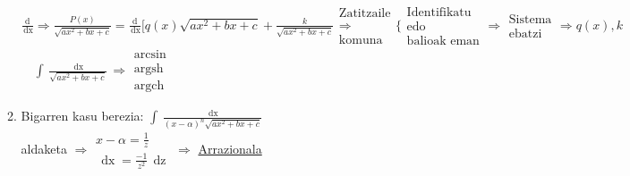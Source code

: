 \documentclass[8pt]{article}
\DeclareMathOperator{\xder}{\, \mathrm{d}x}
\DeclareMathOperator{\zder}{\, \mathrm{d}z}
\DeclareMathOperator{\argsh}{argsh}
\DeclareMathOperator{\argch}{argch}
\begin{document}
\begin{itemize}
\begin{enumerate}
							$ \frac{\mathrm{d}}{\xder} \Rightarrow 
							\frac{P(x)}{\sqrt{a x^2 + bx + c}} = 
							\frac{\mathrm{d}}{\xder}
							[q(x) \sqrt{a x^2 + bx + c} + \frac{k}{\sqrt{a x^2 + bx + c}}
							\begin{array}{c}
								\text{Zatitzaile}\\
								\Rightarrow\\
								\text{komuna}
							\end{array}
							\Bigg \{
							\begin{array}{c}
								\text{Identifikatu}\\
								\text{edo}\\
								\text{balioak eman}
							\end{array}
							\Rightarrow
							\begin{array}{c}
								\text{Sistema}\\
								\text{ebatzi}
							\end{array} \Rightarrow q(x), k $
							$ \quad \int \frac{\xder}{\sqrt{a x^2 + bx + c}}
							\Rightarrow
							\begin{array}{c}
								\arcsin\\
								\argsh\\
								\argch
							\end{array} $
						\item Bigarren kasu berezia:
							$ \int \frac{\xder}{(x - \alpha)^n \sqrt{a x^2 + bx + c}} $\\
							aldaketa $ \Rightarrow 
							\begin{array}{c}
								x - \alpha = \frac{1}{z}\\
								\xder = \frac{-1}{z^2} \zder
							\end{array}
							\Rightarrow $ \underline{Arrazionala}
					\end{enumerate}
			\end{itemize}
\end{document}
